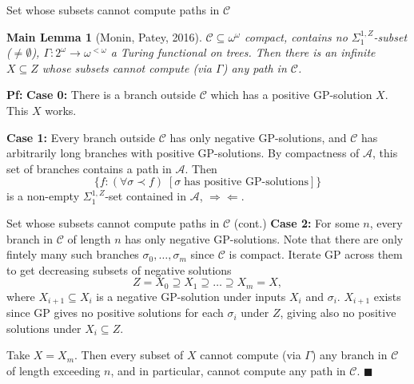 \begin{frame}{Set whose subsets cannot compute paths in $\mathcal{C}$}
  \newtheorem*{main-lemma*}{Main Lemma}
  \begin{main-lemma*}[Monin, Patey, 2016]
    $\mathcal{C}\subseteq\omega^\omega$ compact, contains no
    $\Sigma_1^{1,Z}$-subset ($\neq\emptyset$),
    $\Gamma:2^{\omega}\rightarrow \omega^{<\omega}$ a Turing functional on
    trees. Then there is an infinite $X\subseteq Z$ whose subsets cannot
    compute (via $\Gamma$) any path in $\mathcal{C}$.
  \end{main-lemma*}

  \vspace{0.5em}
  \textbf{Pf:} \textbf{Case 0:} There is a branch outside
  $\mathcal{C}$ which has a positive GP-solution $X$. This $X$ works.

  \vspace{0.5em}
  \textbf{Case 1:} Every branch outside $\mathcal{C}$ has only negative
  GP-solutions, and $\mathcal{C}$ has arbitrarily long branches with
  positive GP-solutions. By compactness of $\mathcal{A}$, this set of
  branches contains a path in $\mathcal{A}$. Then
  \[\{f:(\forall \sigma\prec f)\; [\sigma\; \text{has
  positive GP-solutions}]\}\] is a non-empty $\Sigma_1^{1,Z}$-set contained
  in $\mathcal{A}$, $\Rightarrow\Leftarrow$.
\end{frame}

\begin{frame}{Set whose subsets cannot compute paths in $\mathcal{C}$
(cont.)}
  \textbf{Case 2:} For some $n$, every branch in $\mathcal{C}$ of length
  $n$ has only negative GP-solutions. Note that there are only fintely many
  such branches $\sigma_0,\ldots,\sigma_m$ since $\mathcal{C}$ is compact.
  Iterate GP across them to get decreasing subsets of negative solutions
  \[Z=X_0 \supseteq X_1 \supseteq \ldots\supseteq X_m=X,\]
  where $X_{i+1}\subseteq X_i$ is a negative GP-solution under inputs
  $X_i$ and $\sigma_i$. $X_{i+1}$ exists since GP gives no positive
  solutions for each $\sigma_i$ under $Z$, giving also no positive
  solutions under $X_i\subseteq Z$.
  
  \vspace{1em}
  Take $X=X_m$. Then every subset of $X$ cannot compute (via $\Gamma$) any
  branch in $\mathcal{C}$ of length exceeding $n$, and in particular,
  cannot compute any path in $\mathcal{C}$. $\blacksquare$
\end{frame}

